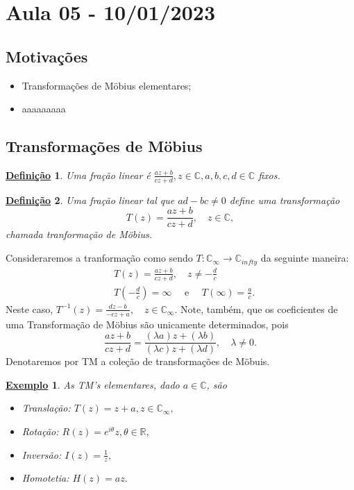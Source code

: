 \documentclass{article}
\newtheorem*{def*}{\underline{Defini\c c\~ao}}
\newtheorem{example}{\underline{Exemplo}}[section]
\begin{document}
\section{Aula 05 - 10/01/2023}
\subsection{Motiva\c c\~oes}
\begin{itemize}
  \item Transforma\c c\~oes de M\"{o}bius elementares;
  \item aaaaaaaaa
\end{itemize}
\subsection{Transforma\c c\~oes de M\"{o}bius}
 \begin{def*}
   Uma fra\c c\~ao linear \'e $\frac{az + b}{cz + d}, z\in \mathbb{C}, a, b, c, d\in \mathbb{C}$ fixos.
 \end{def*}
\begin{def*}
  Uma fra\c c\~ao linear tal que $ad-bc\neq0$ define uma transforma\c c\~ao
  $$
  T(z) = \frac{az + b}{cz + d}, \quad z\in \mathbb{C},
  $$
chamada tranforma\c c\~ao de M\"{o}bius.
\end{def*}
  Consideraremos a tranforma\c c\~ao como sendo $T:\mathbb{C}_{\infty}\rightarrow \mathbb{C}_{infty}$ da seguinte
maneira:
\begin{align*}
  &T(z) = \frac{az + b}{cz + d}, \quad z\neq -\frac{d}{c} \\
  &T(-\frac{d}{c}) = \infty \quad\text{ e }\quad T(\infty) = \frac{a}{c}.
\end{align*}
Neste caso, $T ^{-1}(z) = \frac{dz - b}{-cz + a}, \quad z\in \mathbb{C}_{\infty}.$ Note, tamb\'em, que os coeficientes
de uma Transforma\c c\~ao de M\"{o}bius s\~ao unicamente determinados, pois 
  $$
  \frac{az + b}{cz + d} = \frac{(\lambda a)z + (\lambda b)}{(\lambda c)z + (\lambda d)}, \quad \lambda\neq0.
  $$
  Denotaremos por TM a cole\c c\~ao de transforma\c c\~oes de M\"{o}buis.
 \begin{example}
  As TM's elementares, dado $a\in \mathbb{C}$, s\~ao
 \begin{itemize}
   \item[-] Transla\c c\~ao: $T(z) = z + a, z\in \mathbb{C}_{\infty},$
   \item[-] Rota\c c\~ao: $R(z) = e^{i \theta}z, \theta\in \mathbb{R},$
   \item[-] Invers\~ao: $I(z) = \frac{1}{z},$
   \item[-] Homotetia: $H(z) = az.$
 \end{itemize}
 \end{example}
\end{document}
